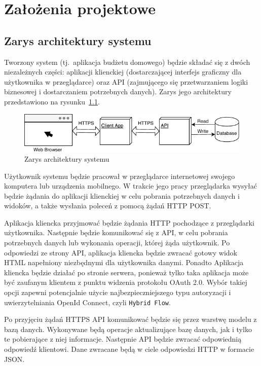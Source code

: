 \chapter{Założenia projektowe}
\label{chap:zalozenia-projektowe}
\section{Zarys architektury systemu}
\label{sec:zarys-arch}
Tworzony system (tj.\ aplikacja budżetu domowego) będzie składać się z dwóch niezależnych części: aplikacji klienckiej (dostarczającej interfejs graficzny dla użytkownika w przeglądarce) oraz API (zajmującego się przetwarzaniem logiki biznesowej i dostarczaniem potrzebnych danych). Zarys jego architektury przedstawiono na rysunku~\ref{fig:ogolna-arch}.
\begin{figure}[h]
	\centering
	\includegraphics[width=.9\linewidth]{rys03/ogolna-arch.pdf}
	\caption{Zarys architektury systemu}
	\label{fig:ogolna-arch}
\end{figure}

Użytkownik systemu będzie pracował w przeglądarce internetowej swojego komputera lub urządzenia mobilnego. W trakcie jego pracy przeglądarka wysyłać będzie żądania do aplikacji klienckiej w celu pobrania potrzebnych danych i widoków, a także wysłania poleceń z pomocą żądań HTTP POST.

Aplikacja kliencka przyjmować będzie żądania HTTP pochodzące z przeglądarki użytkownika. Następnie będzie komunikować się z API, w celu pobrania potrzebnych danych lub wykonania operacji, której żąda użytkownik. Po odpowiedzi ze strony API, aplikacja kliencka będzie zwracać gotowy widok HTML napełniony niezbędnymi dla użytkownika danymi. Ponadto Aplikacja kliencka będzie działać po stronie serwera, ponieważ tylko taka aplikacja może być zaufanym klientem z punktu widzenia protokołu OAuth 2.0. Wybór takiej opcji zapewni potencjalnie użycie najbezpieczniejszego typu autoryzacji i uwierzytelniania OpenId Connect, czyli \texttt{Hybrid Flow}. 

Po przyjęciu żądań HTTPS API komunikować będzie się przez warstwę modelu z bazą danych. Wykonywane będą operacje aktualizujące bazę danych, jak i tylko te pobierające z niej informacje. Następnie API będzie zwracać odpowiednią odpowiedź klientowi. Dane zwracane będą w ciele odpowiedzi HTTP w formacie JSON.

